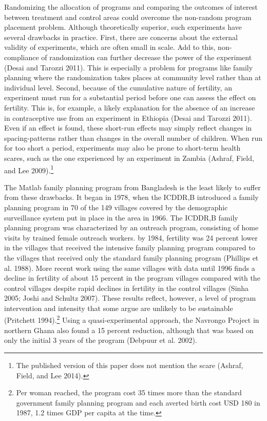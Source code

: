 \documentclass[]{article}
\begin{document}
Randomizing the allocation of programs and comparing the outcomes of interest between treatment and control areas could overcome the non-random program placement problem. Although theoretically superior, such experiments have several drawbacks in practice. First, there are concerns about the external validity of experiments, which are often small in scale. Add to this, non-compliance of randomization can further decrease the power of the experiment (Desai and Tarozzi 2011). This is especially a problem for programs like family planning where the randomization takes places at community level rather than at individual level. Second, because of the cumulative nature of fertility, an experiment must run for a substantial period before one can assess the effect on fertility. This is, for example, a likely explanation for the absence of an increase in contraceptive use from an experiment in Ethiopia (Desai and Tarozzi 2011). Even if an effect is found, these short-run effects may simply reflect changes in spacing-patterns rather than changes in the overall number of children. When run for too short a period, experiments may also be prone to short-term health scares, such as the one experienced by an experiment in Zambia (Ashraf, Field, and Lee 2009).\footnote{The published version of this paper does not mention the scare (Ashraf, Field, and Lee 2014).}

The Matlab family planning program from Bangladesh is the least likely to suffer from these drawbacks. It began in 1978, when the ICDDR,B introduced a family planning program in 70 of the 149 villages covered by the demographic surveillance system put in place in the area in 1966. The ICDDR,B family planning program was characterized by an outreach program, consisting of home visits by trained female outreach workers. by 1984, fertility was 24 percent lower in the villages that received the intensive family planning program compared to the villages that received only the standard family planning program (Phillips et al. 1988). More recent work using the same villages with data until 1996 finds a decline in fertility of about 15 percent in the program villages compared with the control villages despite rapid declines in fertility in the control villages (Sinha 2005; Joshi and Schultz 2007). These results reflect, however, a level of program intervention and intensity that some argue are unlikely to be sustainable (Pritchett 1994).\footnote{Per woman reached, the program cost 35 times more than the standard government family planning program and each averted birth cost USD 180 in 1987, 1.2 times GDP per capita at the time.} Using a quasi-experimental approach, the Navrongo Project in northern Ghana also found a 15 percent reduction, although that was based on only the initial 3 years of the program (Debpuur et al. 2002).
\end{document}
